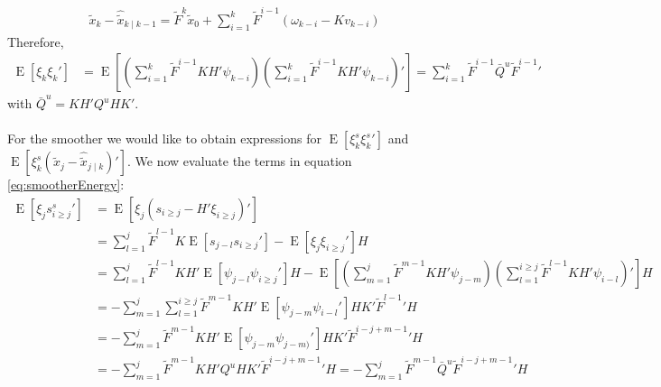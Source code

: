 \documentclass[oneside,12pt]{article}
\begin{document}
%
%
\begin{equation}
    \begin{split}
        \tilde{x}_{k} - \hat{\tilde{x}}_{k \mid k-1} = \tilde{F}^{k} \tilde{x}_0 + \sum_{i=1}^{k} \tilde{F}^{i-1}(\omega_{k-i} - Kv_{k-i})
    \end{split}
\end{equation}    
%
Therefore,
%
\begin{equation}
    \begin{split}
        \operatorname{E}[\xi_k \xi_k'] &= \operatorname{E}[(\sum_{i=1}^k \tilde{F}^{i-1}KH'\psi_{k-i}) (\sum_{i=1}^k \tilde{F}^{i-1}KH'\psi_{k-i})']
        = \sum_{i=1}^k \tilde{F}^{i-1} \bar{Q}^u \tilde{F}^{i-1}'
    \end{split}
\end{equation}
%
with $\bar{Q}^u = K H' Q^u H K'$. \\\\
%
For the smoother we would like to obtain expressions for $\operatorname{E}[\xi^s_{k}\xi^s_{k}']$ and $\operatorname{E}[\xi^s_{k}(\tilde{x}_{j}- \hat{\tilde{x}}_{j \mid k})']$. 
%
We now evaluate the terms in equation \ref{eq:smootherEnergy}:
%
\begin{equation}
    \begin{split}
        \operatorname{E}[  \xi_j s^s_{i \geq j}' ] &= \operatorname{E}[  \xi_j (s_{i \geq j} - H'\xi_{i \geq j})' ]\\
        &= \sum_{l=1}^{j} \tilde{F}^{l-1} K \operatorname{E}[  s_{j-l}s_{i \geq j}' ] - \operatorname{E}[\xi_j \xi_{i \geq j}'] H\\
        &= \sum_{l=1}^{j} \tilde{F}^{l-1} K H' \operatorname{E}[\psi_{j-l} \psi_{i \geq j}'  ] H - \operatorname{E}[(\sum_{m=1}^{j} \tilde{F}^{m-1} K H' \psi_{j-m}) (\sum_{l=1}^{i \geq j} \tilde{F}^{l-1} K H' \psi_{i-l})'] H\\
        &= - \sum_{m=1}^{j} \sum_{l=1}^{i \geq j} \tilde{F}^{m-1} K H' \operatorname{E}[  \psi_{j-m}  \psi_{i-l}' ] H K' \tilde{F}^{l-1}' H\\
        &= - \sum_{m=1}^{j}  \tilde{F}^{m-1} K H' \operatorname{E}[  \psi_{j-m}  \psi_{j-m)}' ] H K' \tilde{F}^{i-j+m-1}' H\\
        &= - \sum_{m=1}^{j}  \tilde{F}^{m-1} K H' Q^u H K' \tilde{F}^{i-j+m-1}' H = - \sum_{m=1}^{j}  \tilde{F}^{m-1} \bar{Q}^u \tilde{F}^{i-j+m-1}' H
    \end{split}
\end{equation}
%
\end{document}

